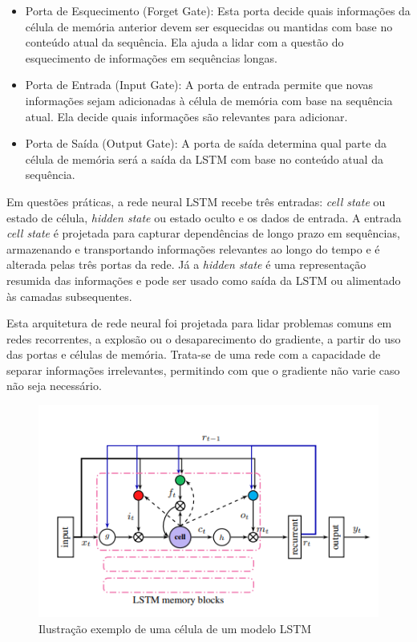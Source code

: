 \begin{itemize}
    \item Porta de Esquecimento (Forget Gate): Esta porta decide quais informações da célula de memória anterior devem ser esquecidas ou mantidas com base no conteúdo atual da sequência. Ela ajuda a lidar com a questão do esquecimento de informações em sequências longas.
    
    \item Porta de Entrada (Input Gate): A porta de entrada permite que novas informações sejam adicionadas à célula de memória com base na sequência atual. Ela decide quais informações são relevantes para adicionar.
    
    \item Porta de Saída (Output Gate): A porta de saída determina qual parte da célula de memória será a saída da LSTM com base no conteúdo atual da sequência.
    
\end{itemize}

Em questões práticas, a rede neural LSTM recebe três entradas: \textit{cell state} ou estado de célula, \textit{hidden state} ou estado oculto e os dados de entrada. A entrada \textit{cell state} é projetada para capturar dependências de longo prazo em sequências, armazenando e transportando informações relevantes ao longo do tempo e é alterada pelas três portas da rede. Já a \textit{hidden state} é uma representação resumida das informações e pode ser usado como saída da LSTM ou alimentado às camadas subsequentes.

Esta arquitetura de rede neural foi projetada para lidar problemas comuns em redes recorrentes, a explosão ou o desaparecimento do gradiente, a partir do uso das portas e células de memória. Trata-se de uma rede com a capacidade de separar informações irrelevantes, permitindo com que o gradiente não varie caso não seja necessário.

\begin{figure}[htb]
	\centering
	\begin{minipage}{0.7\linewidth}
		\centering
		\includegraphics[width=\linewidth]{tg1/figuras/lstm.png}
		\caption{Ilustração exemplo de uma célula de um modelo LSTM
            \cite{lstm_fig}} \label{fig:lstmcell}
	\end{minipage}
\end{figure}

